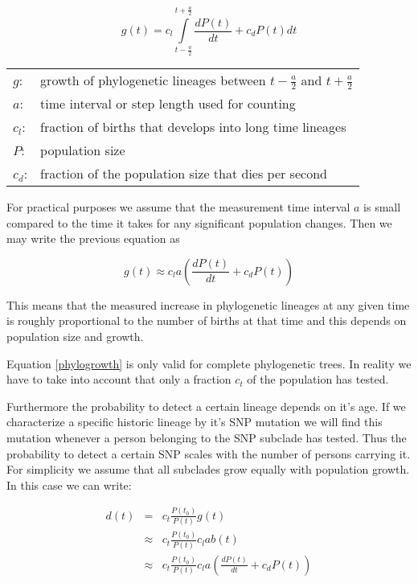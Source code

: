 \begin{equation}
g(t) = c_l \int\limits_{t-\frac{a}{2}}^{t+\frac{a}{2}} \frac{dP(t)}{dt} + c_{d} P(t) dt
\end{equation}

\begin{tabular}{ll}
$g$:     & growth of phylogenetic lineages between $t-\frac{a}{2}$ and $t+\frac{a}{2}$\\
$a$:     & time interval or step length used for counting\\
$c_l$:   & fraction of births that develops into long time lineages\\
$P$:     & population size\\
$c_{d}$: & fraction of the population size that dies per second
\end{tabular}
\vspace{1em}

For practical purposes we assume that the measurement time
interval $a$ is small compared to the time it takes for any
significant population changes. Then we may write the previous
equation as

\begin{equation}
g(t) \approx c_l a \left( \frac{dP(t)}{dt} + c_{d} P(t) \right) \label{phylogrowth}
\end{equation}

This means that the measured increase in phylogenetic lineages
at any given time is roughly proportional to the number of births
at that time and this depends on population size and growth.

Equation \ref{phylogrowth} is only valid for complete phylogenetic
trees. In reality we have to take into account that only a fraction
$c_t$ of the population has tested.

Furthermore the probability to detect a certain lineage depends
on it's age. If we characterize a specific historic lineage by
it's SNP mutation we will find this mutation whenever a person
belonging to the SNP subclade has tested. Thus the probability
to detect a certain SNP scales with the number of persons
carrying it. For simplicity we assume that all subclades grow
equally with population growth. In this case we can write:

\begin{eqnarray}
d(t) & =       & c_t \frac{P(t_0)}{P(t)} g(t)\\
     & \approx & c_t \frac{P(t_0)}{P(t)} c_l a b(t) \\
     & \approx & c_t \frac{P(t_0)}{P(t)} c_l a \left( \frac{dP(t)}{dt} + c_{d} P(t) \right)
\end{eqnarray}

